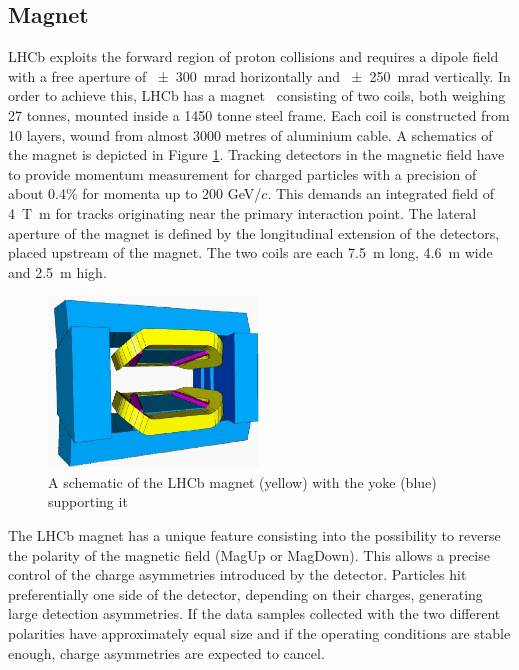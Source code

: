 \subsection{Magnet}
LHCb exploits the forward region of proton collisions and requires a dipole field with a free aperture of \SI{\pm300}{\milli\radian} horizontally and \SI{\pm250}{\milli\radian} vertically. In order to achieve this, LHCb has a magnet~\cite{LHCb:2000xej} consisting of two coils, both weighing 27 tonnes, mounted inside a 1450 tonne steel frame. Each coil is constructed from 10 layers, wound from almost 3000 metres of aluminium cable. A schematics of the magnet is depicted in Figure \ref{fig:magnet}.
Tracking detectors in the magnetic field have to provide momentum measurement for charged particles with a precision of about 0.4\% for momenta up to $200$ GeV/$c$. This demands an integrated field of \SI{4}{\tesla\meter} for tracks originating near the primary interaction point.
 The lateral aperture of the magnet is defined by the longitudinal extension of the detectors, placed upstream of the magnet. The two coils are each \SI{7.5}{\meter} long, \SI{4.6}{\meter} wide and \SI{2.5}{\meter} high.
\begin{figure}
    \centering
    \includegraphics[width=0.5\textwidth]{figures/lhcb-magnet.png}
    \caption{A schematic of the LHCb magnet (yellow) with the yoke (blue) supporting it}
    \label{fig:magnet}
\end{figure}
The LHCb magnet has a unique feature consisting into the possibility to reverse the polarity of the magnetic field (MagUp or MagDown). This allows a precise control of the charge asymmetries introduced by the detector. Particles hit preferentially one side of the detector, depending on their charges, generating large detection asymmetries. If the data samples collected with the two different polarities have approximately equal size and if the operating conditions are stable enough, charge asymmetries are expected to cancel.


